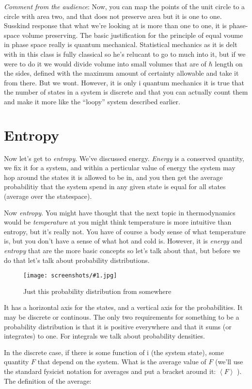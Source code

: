 \documentclass[a4, 12pt, english, USenglish]{scrreprt}
\newcommand{\screenshot}[2]{
\begin{figure}[htb]
\texttt{[image: screenshots/\#1.jpg]}
\label{#1}
\caption{#2}
\end{figure}}
\newcommand{\ev}[1]{\ensuremath{\left\langle{}#1{}\right\rangle}}
\newcommand{\idx}[1]{{\em #1}\index{#1}}
\begin{document}
{\em Comment from the audience}: Now, you can map the points of the
unit circle to a circle with area two, and that does not preserve area
but it is one to one.  Susskind response that what we're looking at is
more than one to one, it is phase-space volume preserving.  The basic
justification for the principle of equal voume in phase space really
is quantum mechanical.  Statistical mechanics as it is delt with in
this class is fully classical so he's relucant to go to much into it,
but if we were to do it we would divide volume into small volumes that
are of \(\hbar\) length on the sides, defined with the maximum amount
of certainty allowable and take it from there.  But we wont.  However,
it is only i quantum mechanics it is true that the number of states in
a system is discrete and that you can actually count them and make it
more like the ``loopy'' system described earlier.


\section{Entropy}

Now let's get to \idx{entropy}.  We've discussed energy.  \idx{Energy}
is a conserved quantity, we fix it for a system, and within a
perticular value of energy the system may hop around the states it is
allowed to be in, and you then get the average probabilitiy that the
system spend in any given state is equal for all states (average over
the statespace).

Now \idx{entropy}. You might have thought that the next topic in
thermodynamics would be \idx{temperature} at you might think temperature is
more intuitive than entropy, but it's really not.  You have of course
a body sense of what temperature is, but you don't have a sense of
what hot and cold is.    However, it is \idx{energy} and \idx{entropy} that are
the more basic concepts so let's talk about that, but before we do
that let's talk about probability distributions.

\screenshot{probabilitydistribution}{Just this probability
 distribution from somewhere}

It has a horizontal axis for the states, and a vertical axis for the
probabilities.  It may be discrete or continous.   The only two
requirements for something to be a probability distribution is that it
is positive everywhere and that it sums (or integrates) to one.  For
integrals we talk about probability densities.

In the discrete case, if there is some function of i (the system
state), some quantity \(F\)
that depend on the system.  What is the average value of \(F\) (we'll use
the standard fysicist  notation for averages and put a bracket around
it: \(\ev{F}\) ).  The definition of the average:
\end{document}
